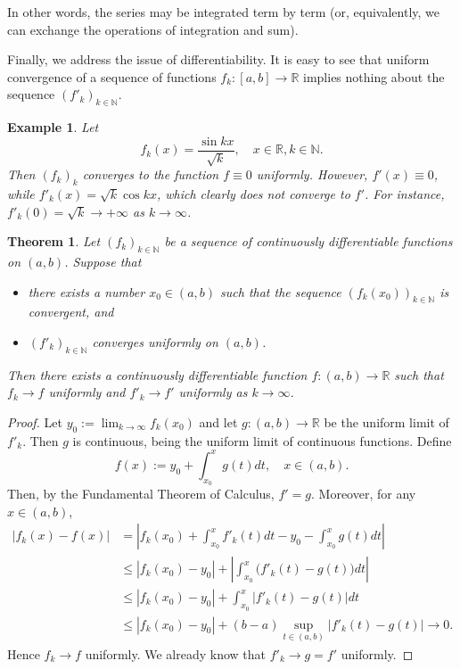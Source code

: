 \documentclass[a4paper,reqno]{amsart}
\numberwithin{equation}{section}
\newtheorem{theorem}[definition]{Theorem}
\newtheorem{example}[definition]{Example}
\def\N{\mathbb{N}}
\def\R{\mathbb{R}}
\begin{document}
In other words, the series may be integrated term by term (or, equivalently, we can exchange the operations of integration and sum).



\medskip

Finally, we address the issue of differentiability. It is easy to see that uniform convergence of a sequence of functions $f_k:[a,b] \to \R$ implies nothing about the sequence 
$(f'_k)_{k\in \N}$. 

\begin{example}
Let 
$$
f_k(x) = \frac{\sin kx}{\sqrt k}, \quad x\in \R, k\in \N.
$$
Then $(f_k)_k$ converges to the function $f\equiv 0$ uniformly. However, $f'(x)\equiv 0$, while $f'_k(x) = \sqrt k\cos kx$, which clearly does not converge to $f'$. For instance, 
$f'_k(0)=\sqrt k \to +\infty$ as $k\to \infty$.
\end{example}



\begin{theorem}\label{uniform:differentiability}
Let $(f_k)_{k\in \mathbb{N}}$ be a sequence of continuously differentiable functions on $(a, b)$. Suppose that
\begin{itemize}
\item[(i)] there exists a number $x_0 \in (a, b)$ such that the sequence $(f_k(x_0))_{k\in \mathbb{N}}$ is convergent, and
\item[(ii)] $(f'_k)_{k\in \mathbb{N}}$ converges uniformly on $(a,b)$.
\end{itemize}
Then there exists a continuously differentiable function $f : (a, b) \to \R$ such that $f_k \to f$ uniformly and $f'_k \to f'$ uniformly as $k \to \infty$.
\end{theorem}

\begin{proof}
Let $y_0:=\lim_{k\to\infty} f_k(x_0)$ and let $g : (a, b) \to \R$ be the uniform limit of $f'_k$. Then $g$ is continuous, being the uniform limit of continuous functions.
Define
$$
f(x):= y_0 + \int_{x_0}^x g(t) dt, \quad x\in (a,b).
$$
Then, by the Fundamental Theorem of Calculus, $f'=g$. Moreover, for any $x\in (a,b)$,
\begin{align*}
\left|f_k(x) - f(x)\right|&= \left|f_k(x_0)+\int_{x_0}^x f'_k(t) dt - y_0 - \int_{x_0}^x g(t) dt\right|\\
&\leq |f_k(x_0)-y_0|+ \left| \int_{x_0}^x \Big(f'_k(t) - g(t)\Big) dt \right|\\
&\leq |f_k(x_0)-y_0|+  \int_{x_0}^x \Big|f'_k(t) - g(t)\Big| dt \\
&\leq |f_k(x_0)-y_0|+  (b-a)\sup_{t\in (a,b)}\Big|f'_k(t) - g(t)\Big| \to 0.
\end{align*}
Hence $f_k \to f$ uniformly. We already know that $f'_k \to g = f'$ uniformly.
\end{proof}
\end{document}
